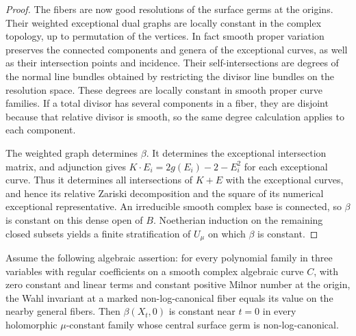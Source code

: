 \begin{proof}
The fibers are now good resolutions of the surface germs at the
origins.  Their weighted exceptional dual graphs are locally constant
in the complex topology, up to permutation of the vertices.
In fact smooth proper variation preserves the connected components
and genera of the exceptional curves, as well as their intersection
points and incidence.  Their self-intersections are degrees of the
normal line bundles obtained by restricting the divisor line bundles
on the resolution space.  These degrees are locally constant in
smooth proper curve families.  If a total divisor has several
components in a fiber, they are disjoint because that relative divisor
is smooth, so the same degree calculation applies to each component.

The weighted graph determines $\beta$.  It determines the exceptional
intersection matrix, and adjunction gives
$K\cdot E_i=2g(E_i)-2-E_i^2$ for each exceptional curve.  Thus it
determines all intersections of $K+E$ with the exceptional curves,
and hence its relative Zariski decomposition and the square of its
numerical exceptional representative.  An irreducible smooth complex
base is connected, so $\beta$ is constant on this dense open of $B$.
Noetherian induction on the remaining closed subsets yields a finite
stratification of $U_\mu$ on which $\beta$ is constant.
\end{proof}

\begin{proposition}
\label{prop:scalar-curve-reduction}
Assume the following algebraic assertion: for every polynomial family
in three variables with regular coefficients on a smooth complex
algebraic curve $C$, with zero constant and linear terms and constant
positive Milnor number at the origin, the Wahl invariant at a marked
non-log-canonical fiber equals its value on the nearby general fibers.
Then $\beta(X_t,0)$ is constant near $t=0$ in every holomorphic
$\mu$-constant family whose central surface germ is non-log-canonical.
\end{proposition}

